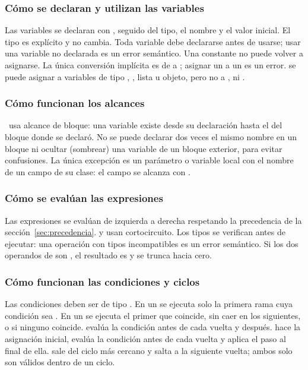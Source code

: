 \subsubsection*{Cómo se declaran y utilizan las variables}
Las variables se declaran con , seguido del tipo, el nombre y el valor inicial. El tipo es explícito y no cambia. Toda variable debe declararse antes de usarse; usar una variable no declarada es un error semántico. Una constante  no puede volver a asignarse. La única conversión implícita es de  a ; asignar un  a un  es un error.  se puede asignar a variables de tipo , , lista u objeto, pero no a ,  ni .

\subsubsection*{Cómo funcionan los alcances}
\ggez\ usa alcance de bloque: una variable existe desde su declaración hasta el  del bloque donde se declaró. No se puede declarar dos veces el mismo nombre en un bloque ni ocultar (sombrear) una variable de un bloque exterior, para evitar confusiones. La única excepción es un parámetro o variable local con el nombre de un campo de su clase: el campo se alcanza con .

\subsubsection*{Cómo se evalúan las expresiones}
Las expresiones se evalúan de izquierda a derecha respetando la precedencia de la sección~\ref{sec:precedencia}.  y  usan cortocircuito. Los tipos se verifican antes de ejecutar: una operación con tipos incompatibles es un error semántico. Si los dos operandos de  son , el resultado es  y se trunca hacia cero.

\subsubsection*{Cómo funcionan las condiciones y ciclos}
Las condiciones deben ser de tipo . En un  se ejecuta solo la primera rama cuya condición sea . En un  se ejecuta el primer  que coincide, sin caer en los siguientes, o  si ninguno coincide.  evalúa la condición antes de cada vuelta y  después.  hace la asignación inicial, evalúa la condición antes de cada vuelta y aplica el paso al final de ella.  sale del ciclo más cercano y  salta a la siguiente vuelta; ambos solo son válidos dentro de un ciclo.


